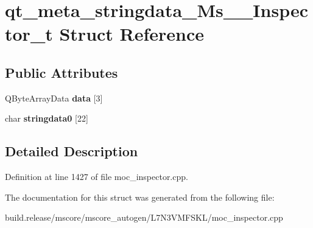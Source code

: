 \hypertarget{structqt__meta__stringdata___ms_____inspector__t}{}\section{qt\+\_\+meta\+\_\+stringdata\+\_\+\+Ms\+\_\+\+\_\+\+Inspector\+\_\+t Struct Reference}
\label{structqt__meta__stringdata___ms_____inspector__t}
\subsection*{Public Attributes}
\begin{DoxyCompactItemize}
\item 
\mbox{\label{structqt__meta__stringdata___ms_____inspector__t_a41b4384f8b074feabc92d0d7434fc497}} 
Q\+Byte\+Array\+Data {\bfseries data} \mbox{[}3\mbox{]}
\item 
\mbox{\label{structqt__meta__stringdata___ms_____inspector__t_ad65a700bfcf2867ee54b39110f8755ce}} 
char {\bfseries stringdata0} \mbox{[}22\mbox{]}
\end{DoxyCompactItemize}


\subsection{Detailed Description}


Definition at line 1427 of file moc\+\_\+inspector.\+cpp.



The documentation for this struct was generated from the following file\+:\begin{DoxyCompactItemize}
\item 
build.\+release/mscore/mscore\+\_\+autogen/\+L7\+N3\+V\+M\+F\+S\+K\+L/moc\+\_\+inspector.\+cpp\end{DoxyCompactItemize}
